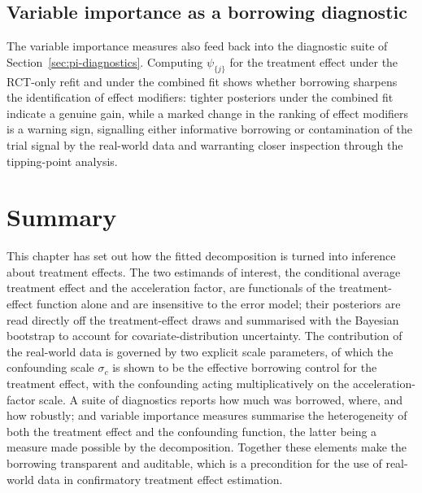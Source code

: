 \documentclass[11pt]{report}
\theoremstyle{plain}
\theoremstyle{definition}
\theoremstyle{remark}
\newcommand{\1}{\mathds{1}}
\theoremstyle{plain}
\theoremstyle{remark}
\begin{document}
\subsection{Variable importance as a borrowing diagnostic}

The variable importance measures also feed back into the diagnostic suite of
Section~\ref{sec:pi-diagnostics}. Computing $\psi_{\{j\}}$ for the treatment
effect under the RCT-only refit and under the combined fit shows whether
borrowing sharpens the identification of effect modifiers: tighter posteriors
under the combined fit indicate a genuine gain, while a marked change in the
ranking of effect modifiers is a warning sign, signalling either informative
borrowing or contamination of the trial signal by the real-world data and
warranting closer inspection through the tipping-point analysis.

\section{Summary}
\label{sec:pi-summary}

This chapter has set out how the fitted decomposition is turned into inference
about treatment effects. The two estimands of interest, the conditional average
treatment effect and the acceleration factor, are functionals of the
treatment-effect function alone and are insensitive to the error model; their
posteriors are read directly off the treatment-effect draws and summarised with
the Bayesian bootstrap to account for covariate-distribution uncertainty. The
contribution of the real-world data is governed by two explicit scale
parameters, of which the confounding scale $\sigma_c$ is shown to be the
effective borrowing control for the treatment effect, with the confounding
acting multiplicatively on the acceleration-factor scale. A suite of diagnostics
reports how much was borrowed, where, and how robustly; and variable importance
measures summarise the heterogeneity of both the treatment effect and the
confounding function, the latter being a measure made possible by the
decomposition. Together these elements make the borrowing transparent and
auditable, which is a precondition for the use of real-world data in
confirmatory treatment effect estimation.



\end{document}
